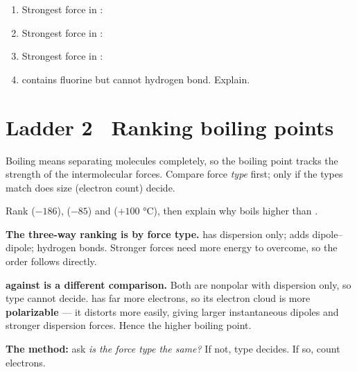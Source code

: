 \documentclass{apchem-worksheet}
\begin{document}
\begin{yourturn}
\begin{enumerate}[leftmargin=*,itemsep=0.5em]
  \item Strongest force in : \workspace[1.4cm]
  \item Strongest force in : \workspace[1.4cm]
  \item Strongest force in : \workspace[1.4cm]
  \item {} contains fluorine but cannot hydrogen bond. Explain.
        \workspace[1.8cm]
\end{enumerate}
\end{yourturn}

\section*{\sffamily Ladder 2 \textbullet\ Ranking boiling points}
 

Boiling means separating molecules completely, so the boiling point tracks
the strength of the intermolecular forces. Compare force \emph{type}
first; only if the types match does size (electron count) decide.

\begin{workedexample}
Rank  ($-186$),  ($-85$) and  ($+100$
\si{\celsius}), then explain why  boils higher than .

\textbf{The three-way ranking is by force type.}  has dispersion
only;  adds dipole--dipole;  hydrogen bonds. Stronger
forces need more energy to overcome, so the order follows directly.

\textbf{ against  is a different comparison.} Both are
nonpolar with dispersion only, so type cannot decide.  has far
more electrons, so its electron cloud is more \textbf{polarizable} --- it
distorts more easily, giving larger instantaneous dipoles and stronger
dispersion forces. Hence the higher boiling point.

\textbf{The method:} ask \emph{is the force type the same?} If not, type
decides. If so, count electrons.
\end{workedexample}
\end{document}
